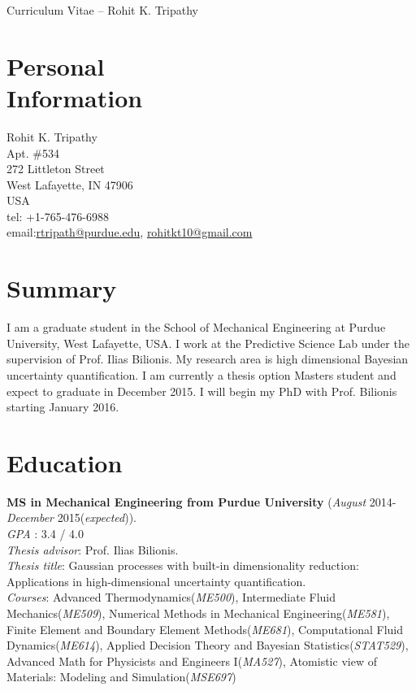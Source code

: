 \documentclass[margin,line,a4paper]{resume}
\begin{document}
{\sc \Large Curriculum Vitae -- Rohit K. Tripathy}
\begin{resume}
    \vspace{0.5cm}




    \section{\mysidestyle Personal\\Information}%
    Rohit K. Tripathy \\
    Apt. \#534  \\ 
    272 Littleton Street \\ 
    West Lafayette, IN 47906 \\
    USA \\ 
    tel: +1-765-476-6988 \\
    email:\href{mailto:rtripath@purdue.edu}{rtripath@purdue.edu}, \href{mailto:rohitkt10@gmail.com}{rohitkt10@gmail.com} \\
    



    \section{\mysidestyle Summary}
    I am a graduate student in the School of Mechanical Engineering at Purdue University, West Lafayette, USA. I work at the Predictive Science Lab under the supervision of Prof. Ilias Bilionis. My research area is high dimensional Bayesian uncertainty quantification. I am currently a thesis option Masters student and expect to graduate in December 2015. I will begin my PhD with Prof. Bilionis starting January 2016.



    \section{\mysidestyle Education} \textbf{MS in Mechanical Engineering from
    Purdue University} (\textit{August} 2014-\textit{December} 2015(\emph{expected})). \\
    \textit{GPA} : 3.4 / 4.0 \\
    \textit{Thesis advisor}: Prof. Ilias Bilionis. \\
    \textit{Thesis title}: Gaussian processes with built-in dimensionality reduction: Applications in high-dimensional uncertainty quantification. \\
    \textit{Courses}: Advanced Thermodynamics(\textit{ME500}),  Intermediate Fluid Mechanics(\textit{ME509}),  Numerical Methods in Mechanical Engineering(\textit{ME581}),  Finite Element and Boundary Element Methods(\textit{ME681}),  Computational Fluid Dynamics(\textit{ME614}),  Applied Decision Theory and Bayesian Statistics(\textit{STAT529}),  Advanced Math for Physicists and Engineers I(\textit{MA527}),  Atomistic view of Materials: Modeling and Simulation(\textit{MSE697})


\end{resume}
\end{document}
